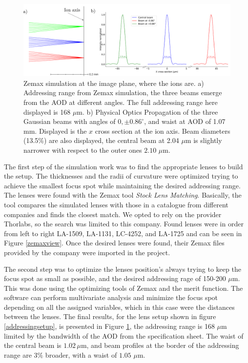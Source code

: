 \begin{figure}
     \centering
     \centering
     \includegraphics[width=1\textwidth]{img/range_plus_3beams}
     \caption{Zemax simulation at the image plane, where the ions are. a) Addressing range from Zemax simulation, the three beams emerge from the AOD at different angles. The full addressing range here displayed is 168 $\mu$m. b) Physical Optics Propagation of the three Gaussian beams with angles of $0,\pm0.86^\circ$, and waist at AOD of 1.07 mm. Displayed is the $x$ cross section at the ion axis. Beam diameters (13.5\%) are also displayed, the central beam at 2.04 $\mu$m is slightly narrower with respect to the outer ones $2.10$ $\mu$m.}
     \label{zemaxrange}
\end{figure}
The first step of the simulation work was to find the appropriate lenses to build the setup. The thicknesses and the radii of curvature were optimized trying to achieve the smallest focus spot while maintaining the desired addressing range. The lenses were found with the Zemax tool \emph{Stock Lens Matching}. Basically, the tool compares the simulated lenses with those in a catalogue from different companies and finds the closest match. We opted to rely on the provider Thorlabs, so the search was limited to this company. Found lenses were in order from left to right LA-1509, LA-1131, LC-4252, and LA-1725 and can be seen in Figure \ref{zemaxview}. Once the desired lenses were found, their Zemax files provided by the company were imported in the project.\par
The second step was to optimize the lenses position's always trying to keep the focus spot as small as possible, and the desired addressing rage of 150-200 $\mu$m. This was done using the optimizing tools of Zemax and the merit function. The software can perform multivariate analysis and minimize the focus spot depending on all the assigned variables, which in this case were the distances between the lenses. The final results, for the lens setup shown in figure \ref{addressingsetup}, is presented in Figure \ref{zemaxrange}, the addressing range is 168 $\mu$m limited by the bandwidth of the AOD from the specification sheet. The waist of the central beam is $1.02\,\mu$m, and beam profiles at the border of the addressing range are $3\%$ broader, with a waist of $1.05$ $\mu$m.\par
